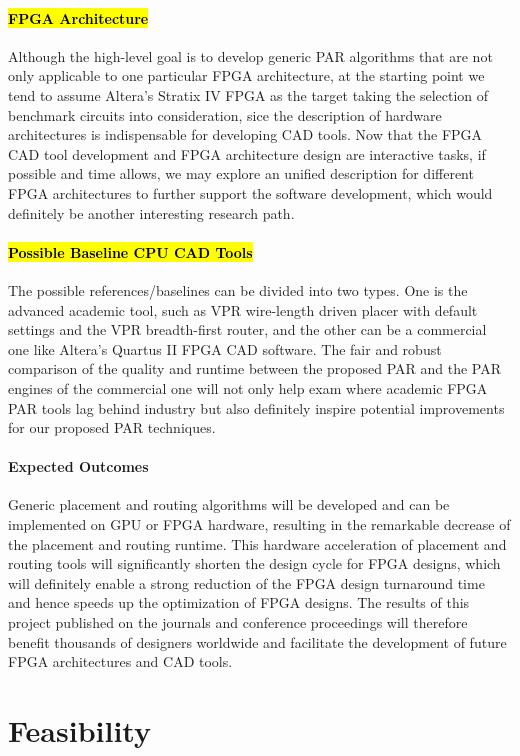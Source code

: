 \documentclass[a4paper,oneside,12pt]{article}
\begin{document}
\paragraph{\hl{FPGA Architecture}}
Although the high-level goal is to develop generic PAR algorithms that are not only applicable to one particular FPGA architecture, at the starting point we tend to assume Altera's Stratix IV FPGA as the target taking the selection of benchmark circuits into consideration, sice the description of hardware architectures is indispensable for developing CAD tools. Now that the FPGA CAD tool development and FPGA architecture design are interactive tasks, if possible and time allows, we may explore an unified description for different FPGA architectures to further support the software development, which would definitely be another interesting research path.

\paragraph{\hl{Possible Baseline CPU CAD Tools}}
The possible references/baselines can be divided into two types. One is the advanced academic tool, such as VPR wire-length driven placer with default settings and the VPR breadth-first router, and the other can be a commercial one like Altera's Quartus II FPGA CAD software.
The fair and robust comparison of the quality and runtime between the proposed PAR and the PAR engines of the commercial one will not only help exam where academic FPGA PAR tools lag behind industry but also definitely inspire potential improvements for our proposed PAR techniques.

\paragraph{Expected Outcomes}
Generic placement and routing algorithms will be developed and can be implemented on GPU or FPGA hardware, resulting in the remarkable decrease of the placement and routing runtime. This hardware acceleration of placement and routing tools will significantly shorten the design cycle for FPGA designs, which will definitely enable a strong reduction of the FPGA design turnaround time and hence speeds up the optimization of FPGA designs. The results of this project published on the journals and conference proceedings will therefore benefit thousands of designers worldwide and facilitate the development of future FPGA architectures and CAD tools.

\section{Feasibility}
\end{document}
